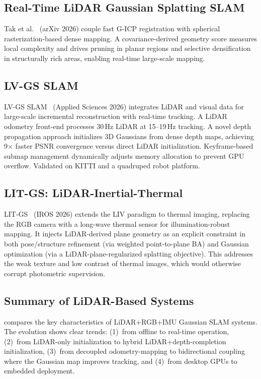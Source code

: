 \subsection{Real-Time LiDAR Gaussian Splatting SLAM}

Tak et al.~\cite{tak2026_realtimelidar} (arXiv 2026) couple fast G-ICP
registration with spherical rasterization-based dense mapping.  A
covariance-derived geometry score measures local complexity and drives
pruning in planar regions and selective densification in structurally rich
areas, enabling real-time large-scale mapping.

\subsection{LV-GS SLAM}

LV-GS SLAM~\cite{he2026lvgsslam} (Applied Sciences 2026) integrates LiDAR
and visual data for large-scale incremental reconstruction with real-time
tracking.  A LiDAR odometry front-end processes 30\,Hz LiDAR at 15--19\,Hz
tracking.  A novel depth propagation approach initializes 3D Gaussians from
dense depth maps, achieving 9$\times$ faster PSNR convergence versus direct
LiDAR initialization.  Keyframe-based submap management dynamically adjusts
memory allocation to prevent GPU overflow.  Validated on KITTI and a
quadruped robot platform.

\subsection{LIT-GS: LiDAR-Inertial-Thermal}

LIT-GS~\cite{shi2026_litgs} (IROS 2026) extends the LIV paradigm to thermal
imaging, replacing the RGB camera with a long-wave thermal sensor for
illumination-robust mapping.  It injects LiDAR-derived plane geometry as an
explicit constraint in both pose/structure refinement (via weighted
point-to-plane BA) and Gaussian optimization (via a LiDAR-plane-regularized
splatting objective).  This addresses the weak texture and low contrast of
thermal images, which would otherwise corrupt photometric supervision.

\subsection{Summary of LiDAR-Based Systems}

 compares the key characteristics of LiDAR+RGB+IMU
Gaussian SLAM systems.  The evolution shows clear trends: (1)~from
offline to real-time operation, (2)~from LiDAR-only initialization to
hybrid LiDAR+depth-completion initialization, (3)~from decoupled
odometry-mapping to bidirectional coupling where the Gaussian map improves
tracking, and (4)~from desktop GPUs to embedded deployment.

